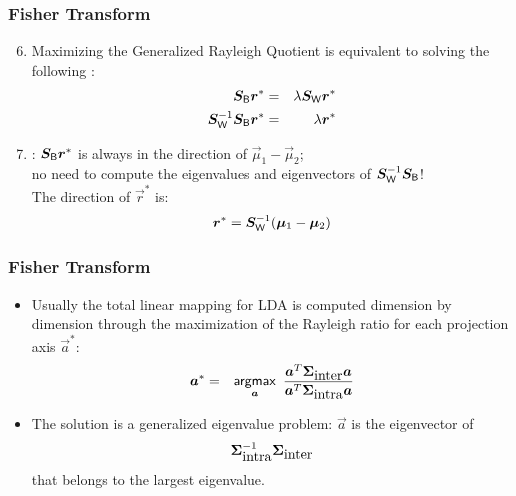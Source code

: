 \begin{frame}
	\frametitle{Fisher Transform \cont}


	\begin{enumerate}
		\setcounter{enumi}{5}
		\item Maximizing the Generalized Rayleigh Quotient is equivalent to solving the following :
		      {\small
		      \begin{eqnarray*}
			      {\bm S}_\mathsf{B} {\bm r}^* &=& \lambda {\bm S}_\mathsf{W} {\bm r}^* \\
			      {\bm S}_\mathsf{W}^{-1} {\bm S}_\mathsf{B} {\bm r}^* &=& \lambda {\bm r}^* \\
		      \end{eqnarray*}
		      }
		\item {}: ${\bm S}_\mathsf{B} {\bm r}^*$ is always in the direction of $\vec{\mu}_1 - \vec{\mu}_2$; \\
		      no need to compute the eigenvalues and eigenvectors of ${\bm S}_\mathsf{W}^{-1} {\bm S}_\mathsf{B}$! \\[.25cm]
		      The direction of $\vec{r}^*$ is:
		      {\small
		      \begin{displaymath}
			      {\bm r}^* = {\bm S}_\mathsf{W}^{-1} ({\bm \mu}_1 - {\bm \mu}_2)
		      \end{displaymath}
		      }
	\end{enumerate}
\end{frame}


\begin{frame}
	\frametitle{Fisher Transform \cont}

	\begin{itemize}
		\item Usually the total linear mapping for LDA is computed dimension by dimension through the maximization of the
		      Rayleigh ratio for each projection axis $\vec a^*$:
		      \begin{eqnarray*}
			      {\bm a}^* &=& \mathop{\mathsf{argmax}}_{{\bm a}}\ \frac{{\bm a}^T {\bm \Sigma}_{\mbox{inter}} {\bm a}}{{\bm a}^T {\bm \Sigma}_{\mbox{intra}} {\bm a}}
		      \end{eqnarray*}
		      \pause
		\item The solution is a generalized eigenvalue problem: $\vec a$ is the eigenvector of
		      $${\bm \Sigma}_{\mbox{intra}} ^{-1} {\bm \Sigma}_{\mbox{inter}}$$
		      that belongs to the largest eigenvalue.
	\end{itemize}
\end{frame}


